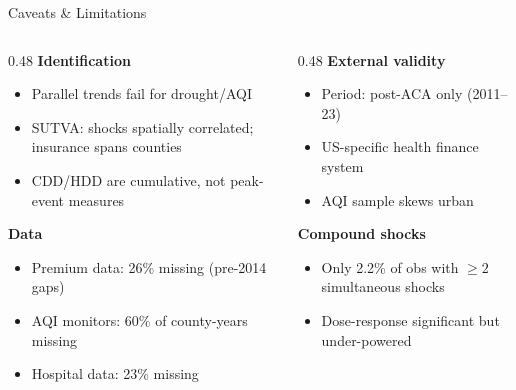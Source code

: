 \documentclass[aspectratio=169,11pt]{beamer}
\begin{document}
\begin{frame}{Caveats \& Limitations}
  \begin{columns}[T]
    \begin{column}{0.48\textwidth}
      \textbf{Identification}
      \begin{itemize}
        \item Parallel trends fail for drought/AQI
        \item SUTVA: shocks spatially correlated; insurance spans counties
        \item CDD/HDD are cumulative, not peak-event measures
      \end{itemize}
      \vspace{0.4em}
      \textbf{Data}
      \begin{itemize}
        \item Premium data: 26\% missing (pre-2014 gaps)
        \item AQI monitors: 60\% of county-years missing
        \item Hospital data: 23\% missing
      \end{itemize}
    \end{column}
    \begin{column}{0.48\textwidth}
      \textbf{External validity}
      \begin{itemize}
        \item Period: post-ACA only (2011--23)
        \item US-specific health finance system
        \item AQI sample skews urban
      \end{itemize}
      \vspace{0.4em}
      \textbf{Compound shocks}
      \begin{itemize}
        \item Only 2.2\% of obs with $\geq 2$ simultaneous shocks
        \item Dose-response significant but under-powered
      \end{itemize}
    \end{column}
  \end{columns}
\end{frame}
\end{document}
